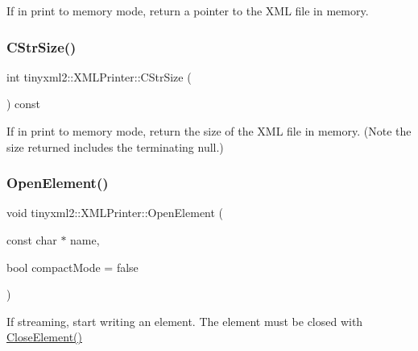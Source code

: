 If in print to memory mode, return a pointer to the X\+ML file in memory. \mbox{\label{classtinyxml2_1_1_x_m_l_printer_a3256cf3523d4898b91abb18b924be04c}} 
\subsubsection{\texorpdfstring{C\+Str\+Size()}{CStrSize()}}
{\footnotesize\ttfamily int tinyxml2\+::\+X\+M\+L\+Printer\+::\+C\+Str\+Size (\begin{DoxyParamCaption}{ }\end{DoxyParamCaption}) const\hspace{0.3cm}{\ttfamily [inline]}}

If in print to memory mode, return the size of the X\+ML file in memory. (Note the size returned includes the terminating null.) \mbox{\label{classtinyxml2_1_1_x_m_l_printer_a20fb06c83bd13e5140d7dd13af06c010}} 
\subsubsection{\texorpdfstring{Open\+Element()}{OpenElement()}}
{\footnotesize\ttfamily void tinyxml2\+::\+X\+M\+L\+Printer\+::\+Open\+Element (\begin{DoxyParamCaption}\item[{const char $\ast$}]{name,  }\item[{bool}]{compact\+Mode = {\ttfamily false} }\end{DoxyParamCaption})}

If streaming, start writing an element. The element must be closed with \mbox{\hyperlink{classtinyxml2_1_1_x_m_l_printer_af1fb439e5d800999646f333fa2f0699a}{Close\+Element()}} \mbox{\label{classtinyxml2_1_1_x_m_l_printer_ab30210a7f32e45634e7a45137bf6fdf6}} 
